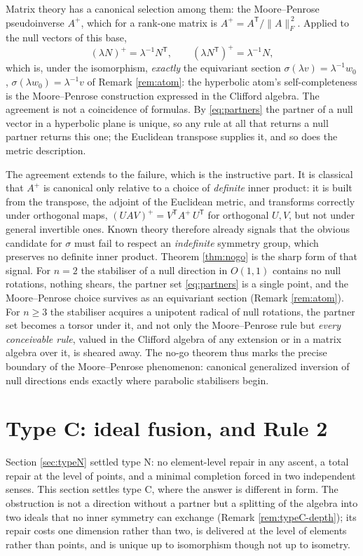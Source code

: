 Matrix theory has a canonical selection among them: the Moore--Penrose pseudoinverse $A^{+}$, which for a rank-one matrix is $A^{+} = A^{\mathsf T}/\lVert A \rVert_F^{\,2}$. Applied to the null vectors of this base,
\[
(\lambda N)^{+} = \lambda^{-1} N^{\mathsf T}, \qquad (\lambda N^{\mathsf T})^{+} = \lambda^{-1} N,
\]
which is, under the isomorphism, \emph{exactly} the equivariant section $\sigma(\lambda v) = \lambda^{-1} w_0$, $\sigma(\lambda w_0) = \lambda^{-1} v$ of Remark \ref{rem:atom}: the hyperbolic atom's self-completeness is the Moore--Penrose construction expressed in the Clifford algebra. The agreement is not a coincidence of formulas. By \eqref{eq:partners} the partner of a null vector in a hyperbolic plane is unique, so any rule at all that returns a null partner returns this one; the Euclidean transpose supplies it, and so does the metric description.

The agreement extends to the failure, which is the instructive part. It is classical that $A^{+}$ is canonical only relative to a choice of \emph{definite} inner product: it is built from the transpose, the adjoint of the Euclidean metric, and transforms correctly under orthogonal maps, $(UAV)^{+} = V^{\mathsf T} A^{+}\, U^{\mathsf T}$ for orthogonal $U, V$, but not under general invertible ones. Known theory therefore already signals that the obvious candidate for $\sigma$ must fail to respect an \emph{indefinite} symmetry group, which preserves no definite inner product. Theorem \ref{thm:nogo} is the sharp form of that signal. For $n = 2$ the stabiliser of a null direction in $O(1,1)$ contains no null rotations, nothing shears, the partner set \eqref{eq:partners} is a single point, and the Moore--Penrose choice survives as an equivariant section (Remark \ref{rem:atom}). For $n \geq 3$ the stabiliser acquires a unipotent radical of null rotations, the partner set becomes a torsor under it, and not only the Moore--Penrose rule but \emph{every conceivable rule}, valued in the Clifford algebra of any extension or in a matrix algebra over it, is sheared away. The no-go theorem thus marks the precise boundary of the Moore--Penrose phenomenon: canonical generalized inversion of null directions ends exactly where parabolic stabilisers begin.

\section{Type C: ideal fusion, and Rule 2}\label{sec:rules}

Section \ref{sec:typeN} settled type N: no element-level repair in any ascent, a total repair at the level of points, and a minimal completion forced in two independent senses. This section settles type C, where the answer is different in form. The obstruction is not a direction without a partner but a splitting of the algebra into two ideals that no inner symmetry can exchange (Remark \ref{rem:typeC-depth}); its repair costs one dimension rather than two, is delivered at the level of elements rather than points, and is unique up to isomorphism though not up to isometry.


